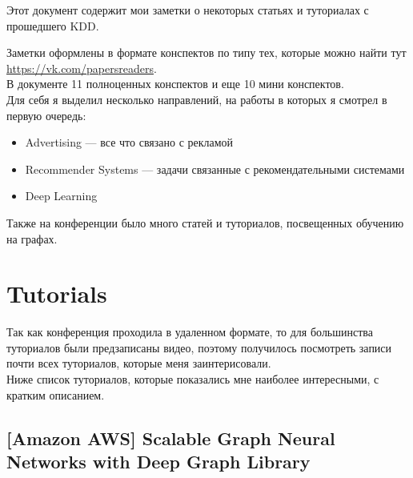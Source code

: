Этот документ содержит мои заметки о некоторых статьях и туториалах с прошедшего KDD.

Заметки оформлены в формате конспектов по типу тех, которые можно найти тут \url{https://vk.com/papersreaders}. \\

В документе 11 полноценных конспектов и еще 10 мини конспектов. \\

Для себя я выделил несколько направлений, на работы в которых я смотрел в первую очередь:
\begin{itemize}
    \item Advertising --- все что связано с рекламой
    \item Recommender Systems --- задачи связанные с рекомендательными системами
    \item Deep Learning
\end{itemize}

Также на конференции было много статей и туториалов, посвещенных обучению на графах.

\chapter{Tutorials}

Так как конференция проходила в удаленном формате, то для большинства туториалов были предзаписаны видео, поэтому получилось посмотреть записи почти всех туториалов, которые меня заинтерисовали. \\

Ниже список туториалов, которые показались мне наиболее интересными, с кратким описанием.





\section*{[Amazon AWS] Scalable Graph Neural Networks with Deep Graph Library} 

